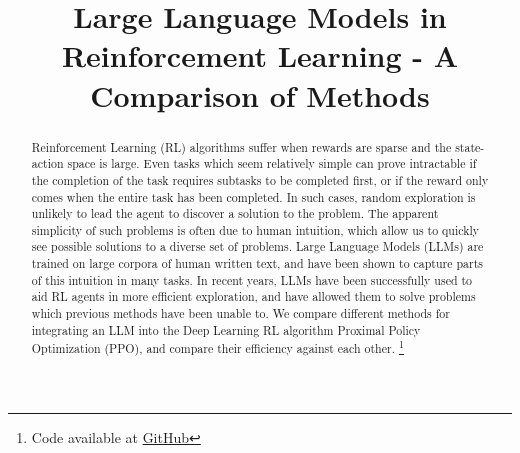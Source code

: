 \documentclass[conference]{IEEEtran}
\begin{document}
\title{Large Language Models in Reinforcement Learning - A Comparison of Methods}
\thispagestyle{plain}
\pagestyle{plain}

\author{
\and
{}
\and
{}
}

\maketitle

\begin{abstract}

Reinforcement Learning (RL) algorithms suffer when rewards are sparse and the state-action space is large. Even tasks which seem relatively simple can prove intractable if the completion of the task requires subtasks to be completed first, or if the reward only comes when the entire task has been completed. In such cases, random exploration is unlikely to lead the agent to discover a solution to the problem. The apparent simplicity of such problems is often due to human intuition, which allow us to quickly see possible solutions to a diverse set of problems. Large Language Models (LLMs) are trained on large corpora of human written text, and have been shown to capture parts of this intuition in many tasks. In recent years, LLMs have been successfully used to aid RL agents in more efficient exploration, and have allowed them to solve problems which previous methods have been unable to. We compare different methods for integrating an LLM into the Deep Learning RL algorithm Proximal Policy Optimization (PPO), and compare their efficiency against each other. \footnote{Code available at \href{https://github.com/jonatan-hanssen/in5490-project}{GitHub}}

\end{abstract}
\end{document}
